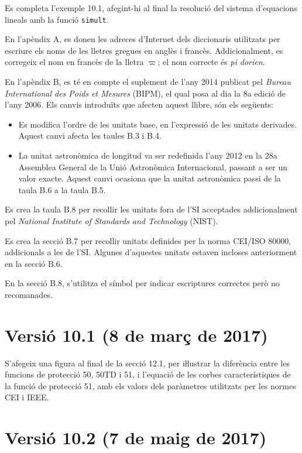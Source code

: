 Es completa l'exemple 10.1, afegint-hi al final la resolució del sistema d'equacions lineals amb la funció \texttt{simult}.


En l'apèndix A, es donen les adreces d'Internet dels diccionaris utilitzats per escriure els noms de les lletres gregues en anglès i francès. Addicionalment, es corregeix el nom en francès de la lletra $\varpi$; el nom correcte és \textit{pi dorien}.

En l'apèndix B, es té en compte el suplement de l'any 2014 publicat pel  \textit{Bureau International des Poids et Mesures} (BIPM), el qual posa al dia la 8a edició de  l'any 2006. Els canvis introduïts que afecten aquest llibre, són els següents:
\begin{itemize}
  \item Es modifica l'ordre de les unitats base, en l'expressió de les unitats derivades. Aquest canvi afecta les taules B.3 i B.4.
  \item La unitat astronòmica de longitud va ser redefinida l'any 2012 en la 28a Assemblea General de la Unió Astronòmica Internacional, passant a ser un valor exacte. Aquest canvi ocasiona que la unitat astronòmica passi de la taula B.6  a la taula  B.5.
\end{itemize}

Es crea la taula B.8 per recollir les unitats fora de l'SI acceptades addicionalment pel \textit{National Institute of Standards and Technology} (NIST).

Es crea la secció B.7 per recollir  unitats definides per la norma  CEI/ISO 80000, addicionals a les de l'SI. Algunes d'aquestes unitats estaven incloses anteriorment en la secció B.6.

En la secció B.8, s'utilitza el símbol \textcolor{Blue}\faQuestionCircle{} per indicar escriptures correctes però no recomanades.

\section*{Versió 10.1 (8 de març de 2017)}

S'afegeix una figura al final de la secció 12.1, per iŀlustrar la diferència entre les funcions de protecció 50, 50TD i 51, i l'equació de les corbes característiques de la funció de protecció 51, amb els valors dels paràmetres utilitzats per les normes CEI i IEEE.

\section*{Versió 10.2 (7 de maig de 2017)}

